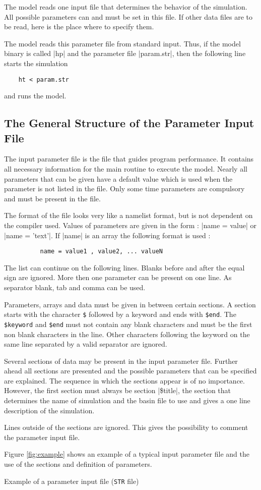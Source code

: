 

The model reads one input file that determines the behavior of the
simulation. All possible parameters can and must be set in this file.
If other data files are to be read, here is the place where to specify
them.

The model reads this parameter file from standard input. Thus, if
the model binary is called |hp| and the parameter file |param.str|, 
then the following line starts the simulation
\begin{verbatim}
	ht < param.str
\end{verbatim}
and runs the model.

\subsection{The General Structure of the Parameter Input File}

The input parameter file is the file that guides program
performance. It contains all necessary information for the main routine
to execute the model. Nearly all parameters that can
be given have a default value which is used when the parameter
is not listed in the file. Only some time parameters are compulsory
and must be present in the file.

The format of the file looks very like a namelist format, but is
not dependent on the compiler used. Values of parameters are given
in the form :  
|name = value|  or  |name = 'text'|.  If |name|
is an array the following format is used : 
\begin{verbatim}
          name = value1 , value2, ... valueN
\end{verbatim}
The list can continue on the following lines. Blanks before and after
the equal sign are ignored. More then one parameter can be present
on one line. As separator blank, tab and comma can be used.

Parameters, arrays and data must be given in between certain sections.
A section starts with the character {\tt \$} followed by a keyword and
ends with {\tt \$end}. The {\tt \$keyword} and {\tt \$end} must not
contain any blank characters and must be the first non blank characters
in the line. Other characters following the keyword on the same line
separated by a valid separator are ignored.

Several sections of data may be present in the input parameter file.
Further ahead all sections are presented and the possible
parameters that can be specified are explained. The sequence in
which the sections appear is of no importance. However, the first 
section must always be section |\$title|, the section that
determines the name of simulation and the basin file to use and
gives a one line description of the simulation.

Lines outside of the sections are ignored. This gives
the possibility to comment the parameter input file.

Figure \ref{fig:example} shows an example of a typical input
parameter file and the use of the sections and definition of
parameters.

{Example of a parameter input file ({\tt STR} file)}

